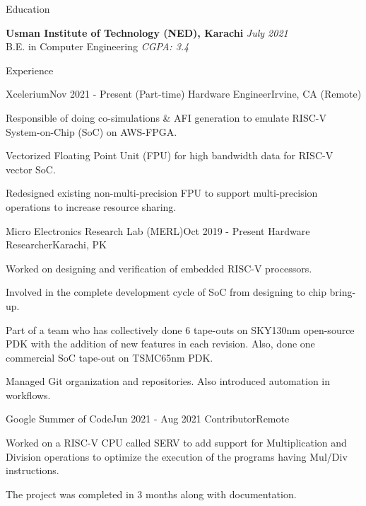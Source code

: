 \documentclass{resume} %
\begin{document}
\begin{rSection}{Education}

{\bf Usman Institute of Technology (NED), Karachi} \hfill {\em July 2021} \\ 
B.E. in Computer Engineering {\em CGPA: 3.4}

\end{rSection}

\begin{rSection}{Experience}

\begin{rSubsection}{Xcelerium}{Nov 2021 - Present (Part-time)}
{Hardware Engineer}{Irvine, CA (Remote)}

\item Responsible of doing co-simulations \& AFI generation to emulate RISC-V System-on-Chip (SoC) on AWS-FPGA.
\item Vectorized Floating Point Unit (FPU) for high bandwidth data for RISC-V vector SoC.
\item Redesigned existing non-multi-precision FPU to support multi-precision operations to increase resource sharing.
\end{rSubsection}

\begin{rSubsection}{Micro Electronics Research Lab (MERL)}{Oct 2019 - Present}
{Hardware Researcher}{Karachi, PK}
\item Worked on designing and verification of embedded RISC-V processors.
\item Involved in the complete development cycle of SoC from designing to chip bring-up.
\item Part of a team who has collectively done 6 tape-outs on SKY130nm open-source PDK with the addition of new features in each revision. Also, done one commercial SoC tape-out on TSMC65nm PDK.
\item Managed Git organization and repositories. Also introduced automation in workflows.
\end{rSubsection}

\begin{rSubsection}{Google Summer of Code}{Jun 2021 - Aug 2021}
{Contributor}{Remote}
\item Worked on a RISC-V CPU called SERV to add support for Multiplication and Division operations to optimize the execution of the programs having Mul/Div instructions. 
\item The project was completed in 3 months along with documentation.
    
\end{rSubsection}

\end{rSection}
\end{document}
